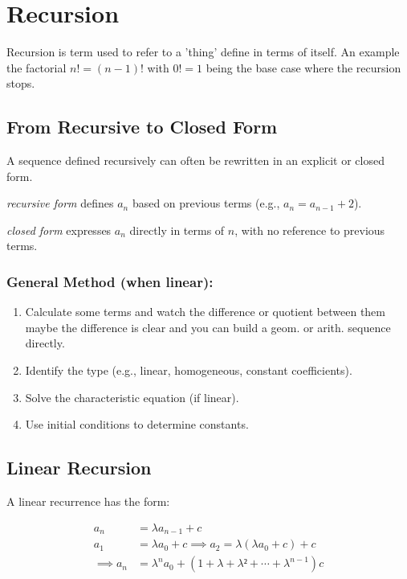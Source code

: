 \newpage
\section{Recursion}

Recursion is term used to refer to a 'thing' define in terms
of itself. An example the factorial \(n! = (n - 1)!\) with \(0! = 1\) being the
base case where the recursion stops.

\subsection{From Recursive to Closed Form}

A sequence defined recursively can often be rewritten in an explicit or closed form.

\emph{recursive form} defines \( a_n \) based on previous terms (e.g., \( a_n = a_{n-1} + 2 \)).

\emph{closed form} expresses \( a_n \) directly in terms of \( n \), with no reference to previous terms.

\subsubsection*{General Method (when linear):}
\begin{enumerate}
    \item Calculate some terms and watch the difference or quotient between them
    maybe the difference is clear and you can build a geom. or arith. sequence directly.
    \item Identify the type (e.g., linear, homogeneous, constant coefficients).
    \item Solve the characteristic equation (if linear).
    \item Use initial conditions to determine constants.
\end{enumerate}

\subsection{Linear Recursion}

A linear recurrence has the form:

\begin{align*}
a_n & = \lambda a_{n -1} + c \\
a_1 & = \lambda a_0 + c \implies a_2 = \lambda (\lambda a_0 + c) + c \\
\implies a_n & = \lambda^n a_0 + (1 + \lambda + \lambda² + \cdots + \lambda^{n - 1})c
\end{align*}

